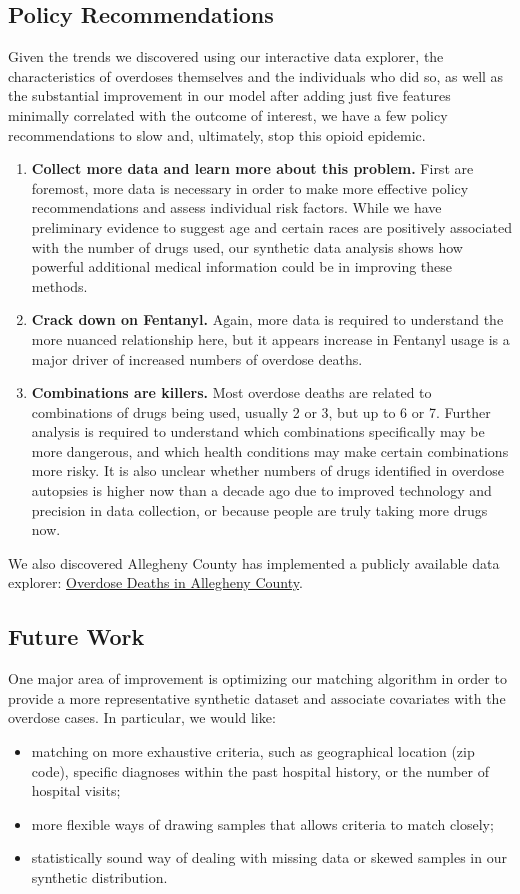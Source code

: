 \documentclass{article}
\begin{document}
\subsection{Policy Recommendations}
Given the trends we discovered using our interactive data explorer, the characteristics of overdoses themselves and the individuals who did so, as well as the substantial improvement in our model after adding just five features minimally correlated with the outcome of interest, we have a few policy recommendations to slow and, ultimately, stop this opioid epidemic.
\begin{enumerate}
\item {\bf Collect more data and learn more about this problem.} First are foremost, more data is necessary in order to make more effective policy recommendations and assess individual risk factors. While we have preliminary evidence to suggest age and certain races are positively associated with the number of drugs used, our synthetic data analysis shows how powerful additional medical information could be in improving these methods.
\item {\bf Crack down on Fentanyl.} Again, more data is required to understand the more nuanced relationship here, but it appears increase in Fentanyl usage is a major driver of increased numbers of overdose deaths.
\item {\bf Combinations are killers.} Most overdose deaths are related to combinations of drugs being used, usually 2 or 3, but up to 6 or 7. Further analysis is required to understand which combinations specifically may be more dangerous, and which health conditions may make certain combinations more risky. It is also unclear whether numbers of drugs identified in overdose autopsies is higher now than a decade ago due to improved technology and precision in data collection, or because people are truly taking more drugs now.
\end{enumerate}
We also discovered Allegheny County has implemented a publicly available data explorer: \href{https://tableau.alleghenycounty.us/t/PublicSite/views/OverdoseinAlleghenyCounty/Home?\%3Aembed=y&\%3AshowAppBanner=false&\%3AshowShareOptions=true&\%3Adisplay_count=no&\%3AshowVizHome=no#5}{Overdose Deaths in Allegheny County}.

\subsection{Future Work}
One major area of improvement is optimizing our matching algorithm in order to provide a more representative synthetic dataset and associate covariates with the overdose cases. In particular, we would like:
\begin{itemize}
\item matching on more exhaustive criteria, such as geographical location (zip code), specific diagnoses within the past hospital history, or the number of hospital visits;
\item more flexible ways of drawing samples that allows criteria to match closely;
\item statistically sound way of dealing with missing data or skewed samples in our synthetic distribution.
\end{itemize}
\end{document}
